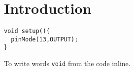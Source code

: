 \documentclass{arduino}
\begin{document}
\section{Introduction}

\lipsum[1]

\begin{lstlisting}
void setup(){
  pinMode(13,OUTPUT);
}
\end{lstlisting}

\lipsum[2]


To write words \lstinline{void} from the code inline.
\end{document}
